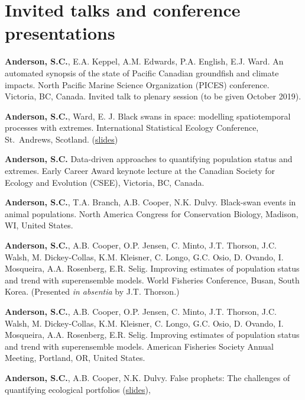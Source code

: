 \hypertarget{invited-talks-and-conference-presentations}{%
\section{Invited talks and conference
presentations}\label{invited-talks-and-conference-presentations}}

\begin{description}
\tightlist
\item[2019]
\textbf{Anderson, S.C.}, E.A. Keppel, A.M. Edwards, P.A. English, E.J.
Ward. An automated synopsis of the state of Pacific Canadian groundfish
and climate impacts. North Pacific Marine Science Organization (PICES)
conference. Victoria, BC, Canada. Invited talk to plenary session (to be
given October 2019).
\item[2018]
\textbf{Anderson, S.C.}, Ward, E. J. Black swans in space: modelling
spatiotemporal processes with extremes. International Statistical
Ecology Conference, St.\ Andrews, Scotland.
(\href{https://www.dropbox.com/s/ufce52ocpycftk1/anderson-ward-isec-2018.pdf?dl=1}{slides})
\item[2017]
\textbf{Anderson, S.C.} Data-driven approaches to quantifying population
status and extremes. Early Career Award keynote lecture at the Canadian
Society for Ecology and Evolution (CSEE), Victoria, BC, Canada.
\item[2016]
\textbf{Anderson, S.C.}, T.A. Branch, A.B. Cooper, N.K. Dulvy.
Black-swan events in animal populations. North America Congress for
Conservation Biology, Madison, WI, United States.
\item[2016]
\textbf{Anderson, S.C.}, A.B. Cooper, O.P. Jensen, C. Minto, J.T.
Thorson, J.C. Walsh, M. Dickey-Collas, K.M. Kleisner, C. Longo, G.C.
Osio, D. Ovando, I. Mosqueira, A.A. Rosenberg, E.R. Selig. Improving
estimates of population status and trend with superensemble models.
World Fisheries Conference, Busan, South Korea. (Presented \emph{in
absentia} by J.T. Thorson.)
\item[2015]
\textbf{Anderson, S.C.}, A.B. Cooper, O.P. Jensen, C. Minto, J.T.
Thorson, J.C. Walsh, M. Dickey-Collas, K.M. Kleisner, C. Longo, G.C.
Osio, D. Ovando, I. Mosqueira, A.A. Rosenberg, E.R. Selig. Improving
estimates of population status and trend with superensemble models.
American Fisheries Society Annual Meeting, Portland, OR, United States.
\item[2013]
\textbf{Anderson, S.C.}, A.B. Cooper, N.K. Dulvy. False prophets: The
challenges of quantifying ecological portfolios
(\href{http://seananderson.ca/talks/2013/PE_SAFS_quantsem.pdf}{slides}),

\end{description}
